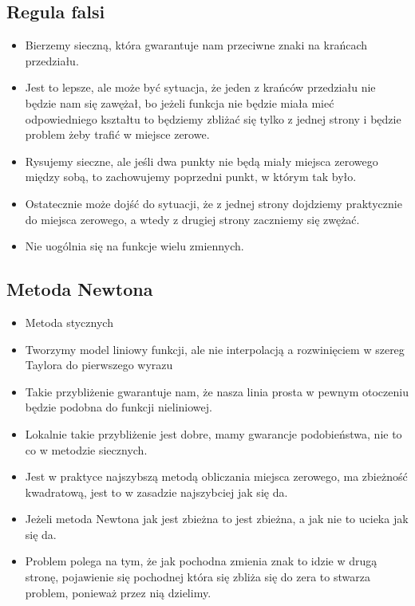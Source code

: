 \documentclass[a4paper]{article}
\begin{document}
\subsection{Regula falsi}
\begin{itemize}
    \item Bierzemy sieczną, która gwarantuje nam przeciwne znaki na krańcach przedziału.
    \item Jest to lepsze, ale może być sytuacja, że jeden z krańców przedziału nie będzie nam się zawężał, bo jeżeli funkcja nie będzie miała mieć odpowiedniego kształtu to będziemy zbliżać się tylko z jednej strony i będzie problem żeby trafić w miejsce zerowe.
    \item Rysujemy sieczne, ale jeśli dwa punkty nie będą miały miejsca zerowego między sobą, to zachowujemy poprzedni punkt, w którym tak było.
    \item Ostatecznie może dojść do sytuacji, że z jednej strony dojdziemy praktycznie do miejsca zerowego, a wtedy z drugiej strony zaczniemy się zwężać.
    \item Nie uogólnia się na funkcje wielu zmiennych.
\end{itemize}

\subsection{Metoda Newtona}
\begin{itemize}
    \item Metoda stycznych
    \item Tworzymy model liniowy funkcji, ale nie interpolacją a rozwinięciem w szereg Taylora do pierwszego wyrazu
    \item Takie przybliżenie gwarantuje nam, że nasza linia prosta w pewnym otoczeniu będzie podobna do funkcji nieliniowej.
    \item Lokalnie takie przybliżenie jest dobre, mamy gwarancje podobieństwa, nie to co w metodzie siecznych.
    \item Jest w praktyce najszybszą metodą obliczania miejsca zerowego, ma zbieżność kwadratową, jest to w zasadzie najszybciej jak się da.
    \item Jeżeli metoda Newtona jak jest zbieżna to jest zbieżna, a jak nie to ucieka jak się da.
    \item Problem polega na tym, że jak pochodna zmienia znak to idzie w drugą stronę, pojawienie się pochodnej która się zbliża się do zera to stwarza problem, ponieważ przez nią dzielimy.
\end{itemize}
\end{document}
